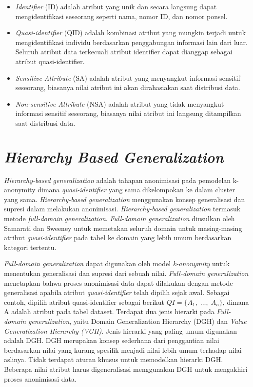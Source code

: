 \begin{itemize}
\item \textit{Identifier} (ID) adalah atribut yang unik dan secara langsung dapat mengidentifikasi seseorang seperti nama, nomor ID, dan nomor ponsel.
\item \textit{Quasi-identifier} (QID) adalah kombinasi atribut yang mungkin terjadi untuk mengidentifikasi individu berdasarkan penggabungan informasi lain dari luar. Seluruh atribut data terkecuali atribut identifier dapat dianggap sebagai atribut quasi-identifier.
\item \textit{Sensitive Attribute} (SA) adalah atribut yang menyangkut informasi  sensitif seseorang, biasanya nilai atribut ini akan dirahasiakan saat distribusi data.
\item \textit{Non-sensitive Attribute} (NSA) adalah atribut yang tidak menyangkut informasi sensitif seseorang, biasanya nilai atribut ini langsung ditampilkan saat distribusi data.
\end{itemize}

\section{\textit{Hierarchy Based Generalization}} 
\label{theory:hierarchy_generalization}
\textit{Hierarchy-based generalization} adalah tahapan anonimisasi pada pemodelan k-anonymity dimana \textit{quasi-identifier} yang sama dikelompokan ke dalam cluster yang sama. \textit{Hierarchy-based generalization} menggunakan konsep generalisasi dan supresi dalam melakukan anonimisasi. \textit{Hierarchy-based generalization} termasuk metode \textit{full-domain generalization}. \textit{Full-domain generalization} diusulkan oleh Samarati dan Sweeney untuk memetakan seluruh domain untuk masing-masing atribut \textit{quasi-identifier} pada tabel ke domain yang lebih umum berdasarkan kategori tertentu.

\textit{Full-domain generalization} dapat digunakan oleh model \textit{k-anonymity} untuk menentukan generalisasi dan supresi dari sebuah nilai. \textit{Full-domain generalization} menetapkan bahwa proses anonimisasi data dapat dilakukan dengan metode generalisasi apabila atribut \textit{quasi-identifier} telah dipilih sejak awal. Sebagai contoh, dipilih atribut quasi-identifier sebagai berikut $QI = \{A_1,\;\ldots ,\;A_n\}$, dimana A adalah atribut pada tabel dataset. Terdapat dua jenis hierarki pada \textit{Full-domain generalization}, yaitu Domain Generalization Hierarchy (DGH) dan \textit{Value Generalization Hierarchy (VGH)}. Jenis hierarki yang paling umum digunakan adalah DGH. DGH merupakan konsep sederhana dari penggantian nilai berdasarkan nilai yang kurang spesifik menjadi nilai lebih umum terhadap nilai aslinya. Tidak terdapat aturan khusus untuk memodelkan hierarki DGH. Beberapa nilai atribut harus digeneralisasi menggunakan DGH untuk mengakhiri proses anonimisasi data. 

